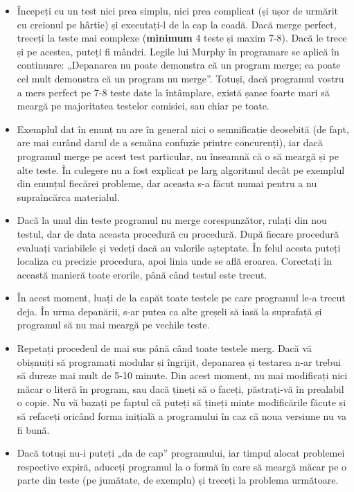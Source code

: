 \begin{itemize}

\item Începeți cu un test nici prea simplu, nici prea complicat (și ușor de
  urmărit cu creionul pe hârtie) și executați-l de la cap la coadă. Dacă merge
  perfect, treceți la teste mai complexe ({\bf minimum} 4 teste și maxim
  7-8). Dacă le trece și pe acestea, puteți fi mândri. Legile lui Murphy în
  programare se aplică în continuare: „Depanarea nu poate demonstra că un
  program merge; ea poate cel mult demonstra că un program nu merge”. Totuși,
  dacă programul vostru a mers perfect pe 7-8 teste date la întâmplare, există
  șanse foarte mari să meargă pe majoritatea testelor comisiei, sau chiar pe
  toate.
  
\item Exemplul dat în enunț nu are în general nici o semnificație deosebită
  (de fapt, are mai curând darul de a semăna confuzie printre concurenți), iar
  dacă programul merge pe acest test particular, nu înseamnă că o să meargă și
  pe alte teste. În culegere nu a fost explicat pe larg algoritmul decât pe
  exemplul din enunțul fiecărei probleme, dar aceasta s-a făcut numai pentru a
  nu supraîncărca materialul.
  
\item Dacă la unul din teste programul nu merge corespunzător, rulați din nou
  testul, dar de data aceasta procedură cu procedură. După fiecare procedură
  evaluați variabilele și vedeți dacă au valorile așteptate. În felul acesta
  puteți localiza cu precizie procedura, apoi linia unde se află
  eroarea. Corectați în această manieră toate erorile, până când testul este
  trecut.
  
\item În acest moment, luați de la capăt toate testele pe care programul le-a
  trecut deja. În urma depanării, s-ar putea ca alte greșeli să iasă la
  suprafață și programul să nu mai meargă pe vechile teste.
  
\item Repetați procedeul de mai sus până când toate testele merg. Dacă vă
  obișnuiți să programați modular și îngrijit, depanarea și testarea n-ar
  trebui să dureze mai mult de 5-10 minute. Din acest moment, nu mai
  modificați nici măcar o literă în program, sau dacă țineți să o faceți,
  păstrați-vă în prealabil o copie. Nu vă bazați pe faptul că puteți să țineți
  minte modificările făcute și să refaceți oricând forma inițială a
  programului în caz că noua versiune nu va fi bună.
  
\item Dacă totuși nu-i puteți „da de cap” programului, iar timpul alocat
  problemei respective expiră, aduceți programul la o formă în care să meargă
  măcar pe o parte din teste (pe jumătate, de exemplu) și treceți la problema
  următoare.

\end{itemize}

